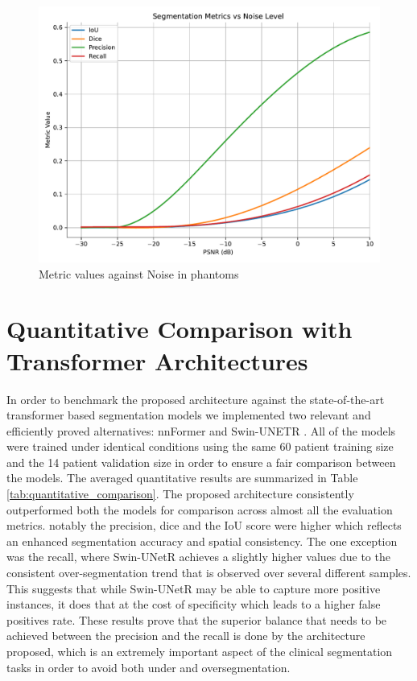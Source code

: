 \begin{figure}[htb!] %
\centering
\centering
\includegraphics[width=1\textwidth]{images/metrics_vs_noise_cubic.pdf}
\caption{\centering Metric values against Noise in phantoms}
\label{Fig:noise}
\end{figure}

\section{Quantitative Comparison with Transformer Architectures}
In order to benchmark the proposed architecture against the state-of-the-art transformer based segmentation models we implemented two relevant and efficiently proved alternatives: nnFormer \cite{zhou2023nnformer} and Swin-UNETR \cite{10.1007/978-3-031-08999-2_22}. All of the models were trained under identical conditions using the same 60 patient training size and the 14 patient validation size in order to ensure a fair comparison between the models. The averaged quantitative results are summarized in Table \ref{tab:quantitative_comparison}. The proposed architecture consistently outperformed both the models for comparison across almost all the evaluation metrics. notably the precision, dice and the IoU score were higher which reflects an enhanced segmentation accuracy and spatial consistency. The one exception was the recall, where Swin-UNetR achieves a slightly higher values due to the consistent over-segmentation trend that is observed over several different samples. This suggests that while Swin-UNetR may be able to capture more positive instances, it does that at the cost of specificity which leads to a higher false positives rate. These results prove that the superior balance that needs to be achieved between the precision and the recall is done by the architecture proposed, which is an extremely important aspect of the clinical segmentation tasks in order to avoid both under and oversegmentation.

